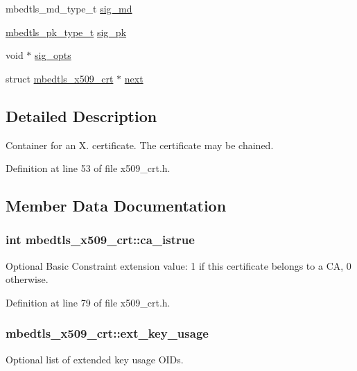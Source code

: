 \begin{DoxyCompactItemize}
\item 
mbedtls\-\_\-md\-\_\-type\-\_\-t \hyperlink{structmbedtls__x509__crt_a5c56937aaf2a51a1d8bc814b142734ca}{sig\-\_\-md}
\item 
\hyperlink{pk_8h_a3fe41eff5605ae727eb9d28dad297020}{mbedtls\-\_\-pk\-\_\-type\-\_\-t} \hyperlink{structmbedtls__x509__crt_a65d5d20352a08c77e173808fde1f8660}{sig\-\_\-pk}
\item 
void $\ast$ \hyperlink{structmbedtls__x509__crt_a67c497ed6535050997c014507a866e9e}{sig\-\_\-opts}
\item 
struct \hyperlink{structmbedtls__x509__crt}{mbedtls\-\_\-x509\-\_\-crt} $\ast$ \hyperlink{structmbedtls__x509__crt_ac9dbc43b90ddd74fe55452495a304923}{next}
\end{DoxyCompactItemize}


\subsection{Detailed Description}
Container for an X. certificate. The certificate may be chained. 

Definition at line 53 of file x509\-\_\-crt.\-h.



\subsection{Member Data Documentation}
\hypertarget{structmbedtls__x509__crt_a196b3a43dae5a1c0058f46075f832890}{
\subsubsection[{ca\-\_\-istrue}]{\setlength{\rightskip}{0pt plus 5cm}int mbedtls\-\_\-x509\-\_\-crt\-::ca\-\_\-istrue}}\label{structmbedtls__x509__crt_a196b3a43dae5a1c0058f46075f832890}
Optional Basic Constraint extension value\-: 1 if this certificate belongs to a C\-A, 0 otherwise. 

Definition at line 79 of file x509\-\_\-crt.\-h.

\hypertarget{structmbedtls__x509__crt_ac94f7360a7143ce1b983fab46c34dcf2}{
\subsubsection[{ext\-\_\-key\-\_\-usage}]{ mbedtls\-\_\-x509\-\_\-crt\-::ext\-\_\-key\-\_\-usage}}\label{structmbedtls__x509__crt_ac94f7360a7143ce1b983fab46c34dcf2}
Optional list of extended key usage O\-I\-Ds. 

